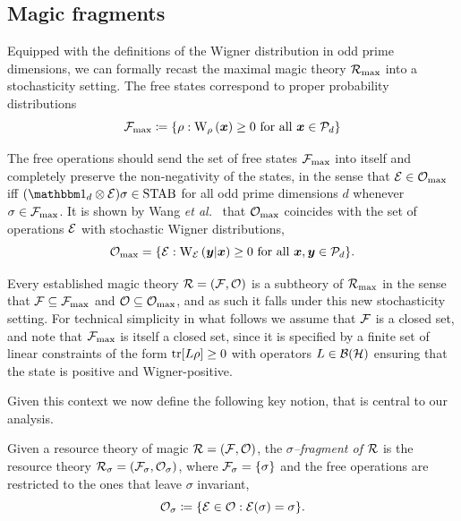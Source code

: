 \documentclass[pra,
aps,
twocolumn,
superscriptaddress,
groupedaddress,
nofootinbib,
reprint
]{revtex4-1}
\begin{document}
\subsection{Magic fragments}\label{sec:magfrag}

Equipped with the definitions of the Wigner distribution in odd prime dimensions, we can formally recast the maximal magic theory $\Rmax$ into a stochasticity setting.
The free states correspond to proper probability distributions 
\begin{equation}
    \Fmax \coloneqq \{ \rho: \W[\bmx]{\rho} \geq 0 \text{ for all } \bmx \in \cal{P}_d\}
\end{equation}

The free operations should send the set of free states $\Fmax$ into itself and completely preserve the non-negativity of the states, in the sense that $\E \in \Omax$ iff $(\id_d \otimes \E ) \sigma \in \stab$ for all odd prime dimensions $d$ whenever $\sigma \in \Fmax$.
It is shown by Wang \textit{et al.}~\cite{Wang_2019} that $\Omax$ coincides with the set of operations $\E$ with stochastic Wigner distributions, 
\begin{equation}
    \Omax = \{ \E: \W[\bmy|\bmx]{\E} \geq 0 \text{ for all } \bmx, \bmy \in \cal{P}_d\}.
\end{equation}

Every established magic theory $\R = (\F, \O)$ is a subtheory of $\Rmax$ in the sense that $\F \subseteq \Fmax$ and $\O \subseteq \Omax$, and as such it falls under this new stochasticity setting. 
For technical simplicity in what follows we assume that $\F$ is a closed set, and note that $\F_{\rm{ max}}$ is itself a closed set, since it is specified by a finite set of linear constraints of the form $\tr[ L\rho] \geq 0$ with operators $L \in \cal{B}(\cal{H})$ ensuring that the state is positive and Wigner-positive.


Given this context we now define the following key notion, that is central to our analysis.
\begin{definition}\label{def:sigmafrag}
   Given a resource theory of magic $\R = (\F, \O)$, the \emph{$\sigma$--fragment of $\R$} is the resource theory $\R_\sigma = (\F_\sigma, \O_\sigma)$, where $\F_\sigma = \{\sigma\}$ and the free operations are restricted to the ones that leave $\sigma$ invariant,
    \begin{equation}
        \O_\sigma \coloneqq \{ \E \in \O: \E(\sigma) = \sigma \}.
    \end{equation}
\end{definition}
\end{document}

